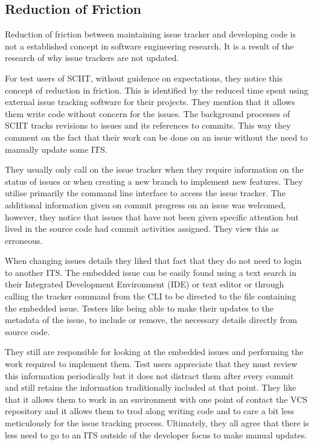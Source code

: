 \documentclass{mproj}
\begin{document}
\subsection{Reduction of Friction}

Reduction of friction between maintaining issue tracker and developing code is not a established concept in software engineering research. It is a result of the research of why issue trackers are not updated. 

For test users of SCIIT, without guidence on expectations, they notice this concept of reduction in friction. This is identified by the reduced time spent using external issue tracking software for their projects. They mention that it allows them write code without concern for the issues. The background processes of SCIIT tracks revisions to issues and its references to commits. This way they comment on the fact that their work can be done on an issue without the need to manually update some ITS.

They usually only call on the issue tracker when they require information on the status of issues or when creating a new branch to implement new features. They utilise primarily the command line interface to access the issue tracker. The additional information given on commit progress on an issue was welcomed, however, they notice that issues that have not been given specific attention but lived in the source code had commit activities assigned. They view this as erroneous.

When changing issues details they liked that fact that they do not need to login to another ITS. The embedded issue can be easily found using a text search in their Integrated Development Environment (IDE) or text editor or through calling the tracker command from the CLI to be directed to the file containing the embedded issue. Testers like being able to make their updates to the metadata of the issue, to include or remove, the necessary details directly from source code.

They still are responsible for looking at the embedded issues and performing the work required to implement them. Test users appreciate that they must review this information periodically but it does not distract them after every commit and still retains the information traditionally included at that point. They like that it allows them to work in an environment with one point of contact the VCS repository and it allows them to trod along writing code and to care a bit less meticulously for the issue tracking process. Ultimately, they all agree that there is less need to go to an ITS outside of the developer focus to make manual updates.
\end{document}
